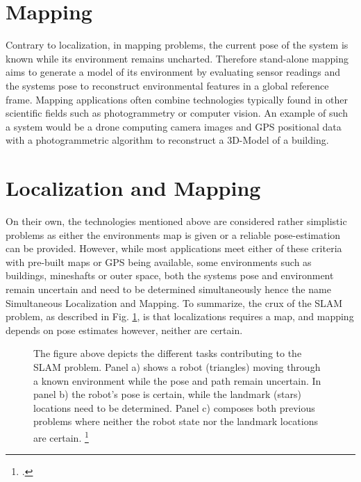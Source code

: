 \section{Mapping}
Contrary to localization, in mapping problems, the current pose of the system is known while its environment remains uncharted.
Therefore stand-alone mapping aims to generate a model of its environment by evaluating sensor readings and the systems pose to reconstruct environmental features in a global reference frame. 
Mapping applications often combine technologies typically found in other scientific fields such as photogrammetry or computer vision.
An example of such a system would be a drone computing camera images and GPS positional data with a photogrammetric algorithm to reconstruct a 3D-Model of a building. 


\section{Localization and Mapping}
On their own, the technologies mentioned above are considered rather simplistic problems as either the environments map is given or a reliable pose-estimation can be provided. However, while most applications meet either of these criteria with pre-built maps or GPS being available, some environments such as buildings, mineshafts or outer space, both the systems pose and environment remain uncertain and need to be determined simultaneously hence the name Simultaneous Localization and Mapping. 
To summarize, the crux of the SLAM problem, as described in Fig. \ref{fig:slamOverview}, is that localizations requires a map, and mapping depends on pose estimates however, neither are certain. 





\begin{figure}
	\centering
	
	\caption{
		The figure above depicts the different tasks contributing to the SLAM problem. Panel a) shows a robot (triangles) moving through a known environment while the pose and path remain uncertain. In panel b) the robot's pose is certain, while the landmark (stars) locations need to be determined. Panel c) composes both previous problems where neither the robot state nor the landmark locations are certain. \footcite{durrantSlam2006}
	}
	\label{fig:slamOverview}
\end{figure}

